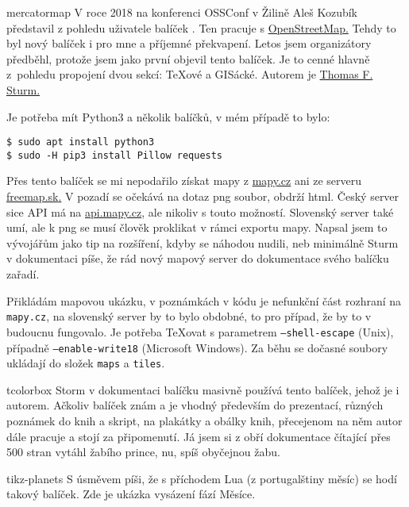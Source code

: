 \pis mercatormap
V roce 2018 na konferenci OSSConf v Žilině Aleš Kozubík představil z pohledu uživatele balíček . Ten pracuje s 
\href{https://wiki.openstreetmap.org/wiki/Tile_servers}{OpenStreetMap.}
Tehdy to byl nový balíček i pro mne a příjemné překvapení. Letos jsem organizátory předběhl, protože jsem jako první objevil tento balíček. Je to cenné hlavně z~pohledu propojení dvou sekcí: \TeX ové a GISácké. Autorem je 
\href{https://ctan.org/author/sturm}{Thomas F. Sturm.}

Je potřeba mít Python3 a několik balíčků, v mém případě to bylo:
\begin{lstlisting}
$ sudo apt install python3
$ sudo -H pip3 install Pillow requests
\end{lstlisting}

Přes tento balíček se mi nepodařilo získat mapy z
\href{https://en.mapy.cz/}{\url{mapy.cz}} ani ze serveru
\href{}{\url{freemap.sk}.}
V pozadí se očekává na dotaz png soubor, obdrží html. 
Český server sice API má na \href{https://api.mapy.cz/}{\url{api.mapy.cz}}, ale nikoliv s touto možností.
Slovenský server také umí, ale k png se musí člověk proklikat v rámci exportu mapy.
Napsal jsem to vývojářům jako tip na rozšíření, kdyby se náhodou nudili, neb minimálně Sturm v dokumentaci píše, že rád nový mapový server do dokumentace svého balíčku zařadí.

Přikládám mapovou ukázku, v poznámkách v kódu je nefunkční část rozhraní na \texttt{mapy.cz}, na slovenský server by to bylo obdobné, to pro případ, že by to v budoucnu fungovalo. Je potřeba \TeX ovat s parametrem \texttt{--shell-escape} (Unix), případně \texttt{--enable-write18} (Microsoft Windows). Za běhu se dočasné soubory ukládají do složek \texttt{maps} a \texttt{tiles}.
\kod

\pis tcolorbox
Storm v dokumentaci balíčku  masivně používá tento balíček, jehož je i autorem. Ačkoliv balíček znám a je vhodný především do prezentací, různých poznámek do knih a skript, na plakátky a obálky knih, přecejenom na něm autor dále pracuje a stojí za připomenutí. Já jsem si z obří dokumentace čítající přes 500 stran vytáhl žabího prince, nu, spíš obyčejnou žabu.
\kod

\pis tikz-planets
S úsměvem píši, že s příchodem Lua (z portugalštiny měsíc) se hodí takový balíček. Zde je ukázka vysázení fází Měsíce.
\kod

